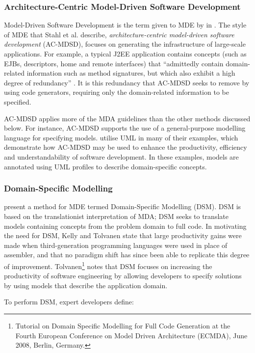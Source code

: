 \subsubsection{Architecture-Centric Model-Driven Software Development}
Model-Driven Software Development is the term given to MDE by in \cite{stahl06mdsd}. The style of MDE that Stahl et al. describe, \textit{architecture-centric model-driven software development} (AC-MDSD), focuses on generating the infrastructure of large-scale applications. For example, a typical J2EE application contains concepts (such as EJBs, descriptors, home and remote interfaces) that ``admittedly contain domain-related information such as method signatures, but which also exhibit a high degree of redundancy'' \cite{stahl06mdsd}. It is this redundancy that AC-MDSD seeks to remove by using code generators, requiring only the domain-related information to be specified.

AC-MDSD applies more of the MDA guidelines than the other methods discussed below. For instance, AC-MDSD supports the use of a general-purpose modelling language for specifying models. \cite{stahl06mdsd} utilise UML in many of their examples, which demonstrate how AC-MDSD may be used to enhance the productivity, efficiency and understandability of software development. In these examples, models are annotated using UML profiles to describe domain-specific concepts.


\subsubsection{Domain-Specific Modelling}
\cite{kelly08dsm} present a method for MDE termed Domain-Specific Modelling (DSM). DSM is based on the translationist interpretation of MDA; DSM seeks to translate models containing concepts from the problem domain to full code. In motivating the need for DSM, Kelly and Tolvanen state that large productivity gains were made when third-generation programming languages were used in place of assembler, and that no paradigm shift has since been able to replicate this degree of improvement. Tolvanen\footnote{Tutorial on Domain Specific Modelling for Full Code Generation at the Fourth European Conference on Model Driven Architecture (ECMDA), June 2008, Berlin, Germany.} notes that DSM focuses on increasing the productivity of software engineering by allowing developers to specify solutions by using models that describe the application domain.

To perform DSM, expert developers define:

